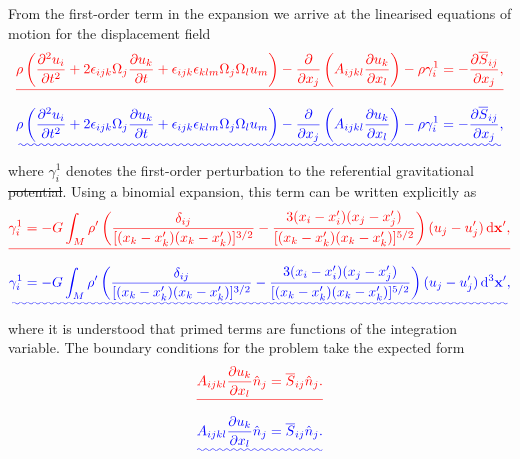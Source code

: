 \documentclass[a4paper,12pt]{paper}
\providecommand{\DIFadd}[1]{{\protect\color{blue}\uwave{#1}}} %
\providecommand{\DIFdel}[1]{{\protect\color{red}\sout{#1}}}                      %
\providecommand{\DIFaddbegin}{} %
\providecommand{\DIFaddend}{} %
\providecommand{\DIFdelbegin}{} %
\providecommand{\DIFdelend}{} %
\begin{document}
From the first-order term in the expansion we arrive at the linearised equations of motion for the displacement field
\DIFdelbegin \begin{displaymath}
\DIFdel{\rho\left(\frac{\partial^{2}u_{i}}{\partial t^{2}}+2\epsilon_{ijk}\Omega_{j}\frac{\partial u_{k}}{\partial t}+
\epsilon_{ijk}\epsilon_{klm}\Omega_{j}\Omega_{l}u_{m}\right)-\frac{\partial}{\partial x_{j}}\left(A_{ijkl}
\frac{\partial u_{k}}{\partial x_{l}}\right)-\rho\gamma_{i}^{1}=-\frac{\partial\overline{S}_{ij}}{\partial x_{j}},
}\end{displaymath}%
\DIFdelend \DIFaddbegin \begin{equation}
\DIFadd{\rho\left(\frac{\partial^{2}u_{i}}{\partial t^{2}}+2\epsilon_{ijk}\Omega_{j}\frac{\partial u_{k}}{\partial t}+
\epsilon_{ijk}\epsilon_{klm}\Omega_{j}\Omega_{l}u_{m}\right)-\frac{\partial}{\partial x_{j}}\left(A_{ijkl}
\frac{\partial u_{k}}{\partial x_{l}}\right)-\rho\gamma_{i}^{1}=-\frac{\partial\overline{S}_{ij}}{\partial x_{j}},
\label{eq:44}
}\end{equation}\DIFaddend 
where $\gamma_{i}^{1}$ denotes the first-order perturbation to the referential gravitational \DIFdelbegin \DIFdel{potential}\DIFdelend \DIFaddbegin \DIFadd{acceleration}\DIFaddend . 
Using a binomial expansion, this term can be written explicitly as
\DIFdelbegin \begin{displaymath}
\DIFdel{\gamma_{i}^{1}=-G\int_{M}\rho'\left(\frac{\delta_{ij}}{[(x_{k}-x_{k}')(x_{k}-x_{k}')]^{3/2}}-
\frac{3(x_{i}-x_{i}')(x_{j}-x_{j}')}{[(x_{k}-x_{k}')(x_{k}-x_{k}')]^{5/2}}\right)(u_{j}-u_{j}')\dd\mathbf{x}',
}\end{displaymath}%
\DIFdelend \DIFaddbegin \begin{equation}
\DIFadd{\gamma_{i}^{1}=-G\int_{M}\rho'\left(\frac{\delta_{ij}}{[(x_{k}-x_{k}')(x_{k}-x_{k}')]^{3/2}}-
\frac{3(x_{i}-x_{i}')(x_{j}-x_{j}')}{[(x_{k}-x_{k}')(x_{k}-x_{k}')]^{5/2}}\right)(u_{j}-u_{j}')\dd^{3}\mathbf{x}',
\label{eq:45}
}\end{equation}\DIFaddend 
where it is understood that primed terms are functions of the integration variable. The boundary conditions 
for the problem take the expected form
\DIFdelbegin \begin{displaymath}
\DIFdel{A_{ijkl}\frac{\partial u_{k}}{\partial x_{l}}\hat{n}_{j}=\overline{S}_{ij}\hat{n}_{j} .
}\end{displaymath}%
\DIFdelend \DIFaddbegin \begin{equation}
\DIFadd{A_{ijkl}\frac{\partial u_{k}}{\partial x_{l}}\hat{n}_{j}=\overline{S}_{ij}\hat{n}_{j}.
\label{eq:46}
}\end{equation}\DIFaddend 
\end{document}
